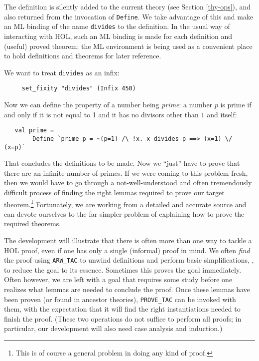 \documentclass[12pt,fleqn,layout,a4paper]{report}
\begin{document}
The definition is silently added to the current theory (see Section
\ref{thy-ops}), and also returned from the invocation of \verb+Define+. We
take advantage of this and make an ML binding of the name \verb+divides+
to the definition. In the usual way of interacting with HOL, such an ML
binding is made for each definition and (useful) proved theorem: the ML
environment is being used as a convenient place to hold definitions and
theorems for later reference.

We want to treat \verb+divides+ as an infix:
{\small\begin{verbatim}
     set_fixity "divides" (Infix 450)
\end{verbatim}}
Now we can define the property of a number being {\it prime}: a number $p$ is
prime if and only if it is not equal to 1 and it has no divisors other
than $1$ and itself:

{\small\begin{verbatim}
   val prime =
        Define `prime p = ~(p=1) /\ !x. x divides p ==> (x=1) \/ (x=p)`
\end{verbatim}}

That concludes the definitions to be made. Now we ``just'' have to prove
that there are an infinite number of primes. If we were coming to this
problem fresh, then we would have to go through a not-well-understood
and often tremendously difficult process of finding the right lemmas
required to prove our target theorem.\footnote{This is of course a
general problem in doing any kind of proof.} Fortunately, we are working
from a detailed and accurate source and can devote ourselves to the far
simpler problem of explaining how to prove the required theorems.

The development will illustrate that there is often more than one way to
tackle a HOL proof, even if one has only a single (informal) proof in
mind. We often {\it find\/} the proof using \verb+ARW_TAC+ to unwind
definitions and perform basic simplifications, \ie, to reduce the goal
to its essence. Sometimes this proves the goal immediately. Often
however, we are left with a goal that requires some study before one
realizes what lemmas are needed to conclude the proof. Once these lemmas
have been proven (or found in ancestor theories), \verb+PROVE_TAC+ can
be invoked with them, with the expectation that it will find the right
instantiations needed to finish the proof. (These two operations do not
suffice to perform all proofs; in particular, our development will also need
case analysis and induction.)
\end{document}
